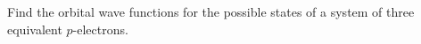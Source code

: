 \ProblemHeading
Find the orbital wave functions for the possible states of a system of three
equivalent $p$-electrons.
